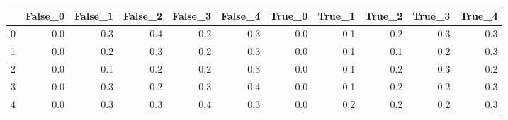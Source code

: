 \begin{tabular}{lrrrrrrrrrr}
\toprule
{} &  False\_0 &  False\_1 &  False\_2 &  False\_3 &  False\_4 &  True\_0 &  True\_1 &  True\_2 &  True\_3 &  True\_4 \\ \hline
\midrule
0 &      0.0 &      0.3 &      0.4 &      0.2 &      0.3 &     0.0 &     0.1 &     0.2 &     0.3 &     0.3 \\ \hline
1 &      0.0 &      0.2 &      0.3 &      0.2 &      0.3 &     0.0 &     0.1 &     0.1 &     0.2 &     0.3 \\ \hline
2 &      0.0 &      0.1 &      0.2 &      0.2 &      0.3 &     0.0 &     0.1 &     0.2 &     0.3 &     0.2 \\ \hline
3 &      0.0 &      0.3 &      0.2 &      0.3 &      0.4 &     0.0 &     0.1 &     0.2 &     0.2 &     0.3 \\ \hline
4 &      0.0 &      0.3 &      0.3 &      0.4 &      0.3 &     0.0 &     0.2 &     0.2 &     0.2 &     0.3 \\ \hline
\bottomrule
\end{tabular}
